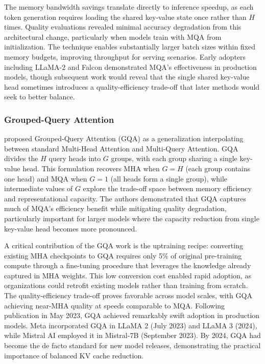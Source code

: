 The memory bandwidth savings translate directly to inference speedup, as each token generation requires loading the shared key-value state once rather than $H$ times. Quality evaluations revealed minimal accuracy degradation from this architectural change, particularly when models train with MQA from initialization. The technique enables substantially larger batch sizes within fixed memory budgets, improving throughput for serving scenarios. Early adopters including LLaMA-2 and Falcon demonstrated MQA's effectiveness in production models, though subsequent work would reveal that the single shared key-value head sometimes introduces a quality-efficiency trade-off that later methods would seek to better balance.

\subsubsection{Grouped-Query Attention}

\citet{ainslie2023gqa} proposed Grouped-Query Attention (GQA) as a generalization interpolating between standard Multi-Head Attention and Multi-Query Attention. GQA divides the $H$ query heads into $G$ groups, with each group sharing a single key-value head. This formulation recovers MHA when $G = H$ (each group contains one head) and MQA when $G = 1$ (all heads form a single group), while intermediate values of $G$ explore the trade-off space between memory efficiency and representational capacity. The authors demonstrated that GQA captures much of MQA's efficiency benefit while mitigating quality degradation, particularly important for larger models where the capacity reduction from single key-value head becomes more pronounced.

A critical contribution of the GQA work is the uptraining recipe: converting existing MHA checkpoints to GQA requires only 5\% of original pre-training compute through a fine-tuning procedure that leverages the knowledge already captured in MHA weights. This low conversion cost enabled rapid adoption, as organizations could retrofit existing models rather than training from scratch. The quality-efficiency trade-off proves favorable across model scales, with GQA achieving near-MHA quality at speeds comparable to MQA. Following publication in May 2023, GQA achieved remarkably swift adoption in production models. Meta incorporated GQA in LLaMA 2 (July 2023) and LLaMA 3 (2024), while Mistral AI employed it in Mistral-7B (September 2023). By 2024, GQA had become the de facto standard for new model releases, demonstrating the practical importance of balanced KV cache reduction.

